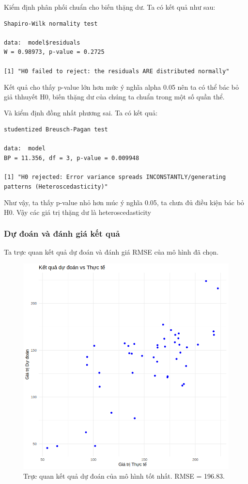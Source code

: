 Kiểm định phân phối chuẩn cho biến thặng dư. Ta có kết quả như sau:
\begin{lstlisting}
Shapiro-Wilk normality test

data:  model$residuals
W = 0.98973, p-value = 0.2725

[1] "H0 failed to reject: the residuals ARE distributed normally"
\end{lstlisting}
Kết quả cho thấy p-value lớn hơn mức ý nghĩa alpha 0.05 nên ta có thể bác bỏ giả thhuyết H0, biến thặng dư của chúng ta chuẩn trong một số quần thể.  

Và kiểm định đồng nhất phương sai. Ta có kết quả:
\begin{lstlisting}
studentized Breusch-Pagan test

data:  model
BP = 11.356, df = 3, p-value = 0.009948

[1] "H0 rejected: Error variance spreads INCONSTANTLY/generating patterns (Heteroscedasticity)"
\end{lstlisting}
Như vậy, ta thấy p-value nhỏ hơn múc ý nghĩa 0.05, ta chưa đủ điều kiện bác bỏ H0. Vậy các giá trị thặng dư là heteroscedasticity

\subsubsection{Dự đoán và đánh giá kết quả}

Ta trực quan kết quả dự đoán và đánh giá RMSE của mô hình đã chọn.

\begin{figure}[H]
    \centering
    \includegraphics[width=0.75\columnwidth]{csm_figures/prediction_model_best.png}
    \caption{Trực quan kết quả dự đoán của mô hình tốt nhất. RMSE = 196.83.}
    \label{fig:prediction_model_best}
\end{figure}

